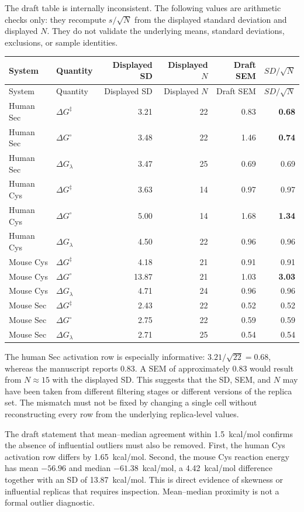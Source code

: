 \documentclass[11pt,a4paper]{article}
\begin{document}
The draft table is internally inconsistent. The following values are arithmetic checks only: they recompute $s/\sqrt{N}$ from the displayed standard deviation and displayed $N$. They do not validate the underlying means, standard deviations, exclusions, or sample identities.

\begin{longtable}{llrrrr}
\toprule
System & Quantity & Displayed SD & Displayed $N$ & Draft SEM & $SD/\sqrt{N}$ \\
\midrule
\endfirsthead
\toprule
System & Quantity & Displayed SD & Displayed $N$ & Draft SEM & $SD/\sqrt{N}$ \\
\midrule
\endhead
Human Sec & $\Delta G^{\ddagger}$ & 3.21 & 22 & 0.83 & \textbf{0.68} \\
Human Sec & $\Delta G^{\circ}$     & 3.48 & 22 & 1.46 & \textbf{0.74} \\
Human Sec & $\Delta G_{\lambda}$  & 3.47 & 25 & 0.69 & 0.69 \\
Human Cys & $\Delta G^{\ddagger}$ & 3.63 & 14 & 0.97 & 0.97 \\
Human Cys & $\Delta G^{\circ}$     & 5.00 & 14 & 1.68 & \textbf{1.34} \\
Human Cys & $\Delta G_{\lambda}$  & 4.50 & 22 & 0.96 & 0.96 \\
Mouse Cys & $\Delta G^{\ddagger}$ & 4.18 & 21 & 0.91 & 0.91 \\
Mouse Cys & $\Delta G^{\circ}$     & 13.87 & 21 & 1.03 & \textbf{3.03} \\
Mouse Cys & $\Delta G_{\lambda}$  & 4.71 & 24 & 0.96 & 0.96 \\
Mouse Sec & $\Delta G^{\ddagger}$ & 2.43 & 22 & 0.52 & 0.52 \\
Mouse Sec & $\Delta G^{\circ}$     & 2.75 & 22 & 0.59 & 0.59 \\
Mouse Sec & $\Delta G_{\lambda}$  & 2.71 & 25 & 0.54 & 0.54 \\
\bottomrule
\end{longtable}

The human Sec activation row is especially informative: $3.21/\sqrt{22}=0.68$, whereas the manuscript reports 0.83. A SEM of approximately 0.83 would result from $N\approx15$ with the displayed SD. This suggests that the SD, SEM, and $N$ may have been taken from different filtering stages or different versions of the replica set. The mismatch must not be fixed by changing a single cell without reconstructing every row from the underlying replica-level values.

The draft statement that mean--median agreement within 1.5~kcal/mol confirms the absence of influential outliers must also be removed. First, the human Cys activation row differs by 1.65~kcal/mol. Second, the mouse Cys reaction energy has mean $-56.96$ and median $-61.38$~kcal/mol, a 4.42~kcal/mol difference together with an SD of 13.87~kcal/mol. This is direct evidence of skewness or influential replicas that requires inspection. Mean--median proximity is not a formal outlier diagnostic.
\end{document}
